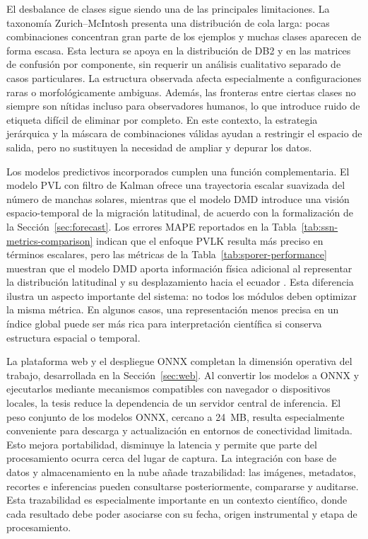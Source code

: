 El desbalance de clases sigue siendo una de las principales limitaciones. La
taxonomía Zurich--McIntosh presenta una distribución de cola larga: pocas
combinaciones concentran gran parte de los ejemplos y muchas clases aparecen de
forma escasa. Esta lectura se apoya en la distribución de DB2 y en las matrices
de confusión por componente, sin requerir un análisis cualitativo separado de
casos particulares. La estructura observada afecta especialmente a
configuraciones raras o morfológicamente ambiguas. Además, las fronteras entre
ciertas clases no siempre son nítidas incluso para observadores humanos, lo que
introduce ruido de etiqueta difícil de eliminar por completo. En este contexto,
la estrategia jerárquica y la máscara de combinaciones válidas ayudan a
restringir el espacio de salida, pero no sustituyen la necesidad de ampliar y
depurar los datos.

Los modelos predictivos incorporados cumplen una función complementaria. El
modelo PVL con filtro de Kalman ofrece una trayectoria escalar suavizada del
número de manchas solares, mientras que el modelo DMD introduce una visión
espacio-temporal de la migración latitudinal, de acuerdo con la formalización de
la Sección~\ref{sec:forecast}. Los errores MAPE reportados en la
Tabla~\ref{tab:ssn-metrics-comparison} indican que el enfoque PVLK resulta más
preciso en términos escalares, pero las métricas de la Tabla~\ref{tab:sporer-performance}
muestran que el modelo DMD aporta información física adicional al representar la
distribución latitudinal y su desplazamiento hacia el ecuador
\citep{kalman1960newapproach,podladchikova2012kalman,schmid2010dmd,kutz2016dmd}.
Esta diferencia ilustra un aspecto importante
del sistema: no todos los módulos deben optimizar la misma métrica. En algunos
casos, una representación menos precisa en un índice global puede ser más rica
para interpretación científica si conserva estructura espacial o temporal.

La plataforma web y el despliegue ONNX completan la dimensión operativa del
trabajo, desarrollada en la Sección~\ref{sec:web}. Al convertir los modelos a
ONNX y ejecutarlos mediante mecanismos compatibles con navegador o dispositivos
locales, la tesis reduce la dependencia de un servidor central de inferencia. El
peso conjunto de los modelos ONNX, cercano a 24~MB, resulta especialmente
conveniente para descarga y actualización en entornos de conectividad limitada.
Esto mejora portabilidad, disminuye la latencia y permite que parte del
procesamiento ocurra cerca del lugar de captura.
La integración con base de datos y almacenamiento en la nube añade trazabilidad:
las imágenes, metadatos, recortes e inferencias pueden consultarse posteriormente,
compararse y auditarse. Esta trazabilidad es especialmente importante en un
contexto científico, donde cada resultado debe poder asociarse con su fecha,
origen instrumental y etapa de procesamiento.

